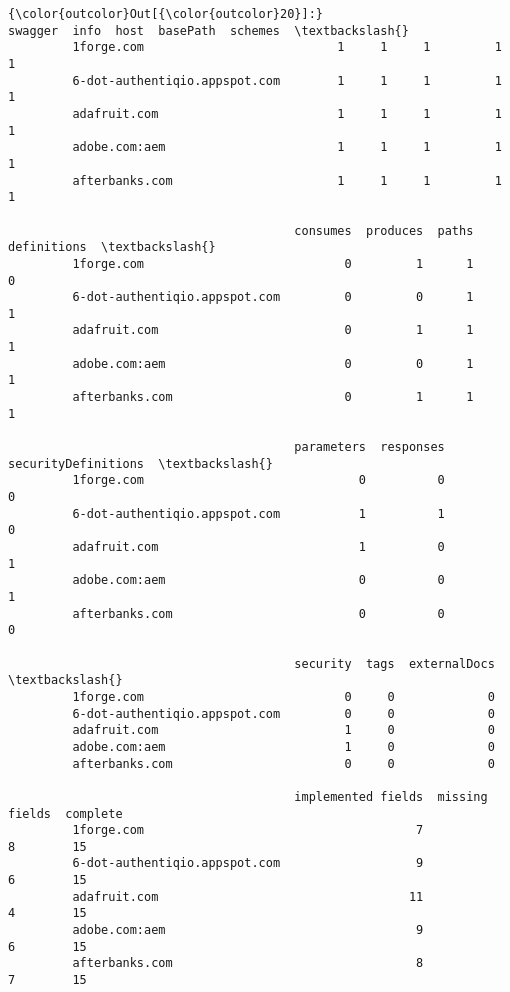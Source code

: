 \documentclass[11pt]{article}
\begin{document}
\begin{Verbatim}[commandchars=\\\{\}]
{\color{outcolor}Out[{\color{outcolor}20}]:}                                swagger  info  host  basePath  schemes  \textbackslash{}
         1forge.com                           1     1     1         1        1   
         6-dot-authentiqio.appspot.com        1     1     1         1        1   
         adafruit.com                         1     1     1         1        1   
         adobe.com:aem                        1     1     1         1        1   
         afterbanks.com                       1     1     1         1        1   
         
                                        consumes  produces  paths  definitions  \textbackslash{}
         1forge.com                            0         1      1            0   
         6-dot-authentiqio.appspot.com         0         0      1            1   
         adafruit.com                          0         1      1            1   
         adobe.com:aem                         0         0      1            1   
         afterbanks.com                        0         1      1            1   
         
                                        parameters  responses  securityDefinitions  \textbackslash{}
         1forge.com                              0          0                    0   
         6-dot-authentiqio.appspot.com           1          1                    0   
         adafruit.com                            1          0                    1   
         adobe.com:aem                           0          0                    1   
         afterbanks.com                          0          0                    0   
         
                                        security  tags  externalDocs  \textbackslash{}
         1forge.com                            0     0             0   
         6-dot-authentiqio.appspot.com         0     0             0   
         adafruit.com                          1     0             0   
         adobe.com:aem                         1     0             0   
         afterbanks.com                        0     0             0   
         
                                        implemented fields  missing fields  complete  
         1forge.com                                      7               8        15  
         6-dot-authentiqio.appspot.com                   9               6        15  
         adafruit.com                                   11               4        15  
         adobe.com:aem                                   9               6        15  
         afterbanks.com                                  8               7        15  
\end{Verbatim}
            
\end{document}
